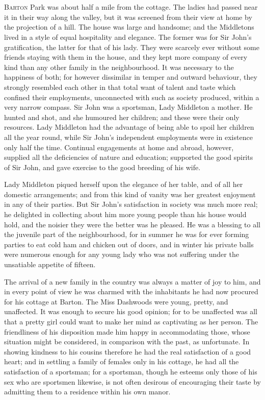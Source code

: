 \chapter[Chapter \thechapter]{}
\lettrine[lraise=0.3]{B}{arton} Park was about half a mile from the cottage. The ladies had passed near it in their way along the valley, but it was screened from their view at home by the projection of a hill. The house was large and handsome; and the Middletons lived in a style of equal hospitality and elegance. The former was for Sir John's gratification, the latter for that of his lady. They were scarcely ever without some friends staying with them in the house, and they kept more company of every kind than any other family in the neighbourhood. It was necessary to the happiness of both; for however dissimilar in temper and outward behaviour, they strongly resembled each other in that total want of talent and taste which confined their employments, unconnected with such as society produced, within a very narrow compass. Sir John was a sportsman, Lady Middleton a mother. He hunted and shot, and she humoured her children; and these were their only resources. Lady Middleton had the advantage of being able to spoil her children all the year round, while Sir John's independent employments were in existence only half the time. Continual engagements at home and abroad, however, supplied all the deficiencies of nature and education; supported the good spirits of Sir John, and gave exercise to the good breeding of his wife.

Lady Middleton piqued herself upon the elegance of her table, and of all her domestic arrangements; and from this kind of vanity was her greatest enjoyment in any of their parties. But Sir John's satisfaction in society was much more real; he delighted in collecting about him more young people than his house would hold, and the noisier they were the better was he pleased. He was a blessing to all the juvenile part of the neighbourhood, for in summer he was for ever forming parties to eat cold ham and chicken out of doors, and in winter his private balls were numerous enough for any young lady who was not suffering under the unsatiable appetite of fifteen.

The arrival of a new family in the country was always a matter of joy to him, and in every point of view he was charmed with the inhabitants he had now procured for his cottage at Barton. The Miss Dashwoods were young, pretty, and unaffected. It was enough to secure his good opinion; for to be unaffected was all that a pretty girl could want to make her mind as captivating as her person. The friendliness of his disposition made him happy in accommodating those, whose situation might be considered, in comparison with the past, as unfortunate. In showing kindness to his cousins therefore he had the real satisfaction of a good heart; and in settling a family of females only in his cottage, he had all the satisfaction of a sportsman; for a sportsman, though he esteems only those of his sex who are sportsmen likewise, is not often desirous of encouraging their taste by admitting them to a residence within his own manor.

